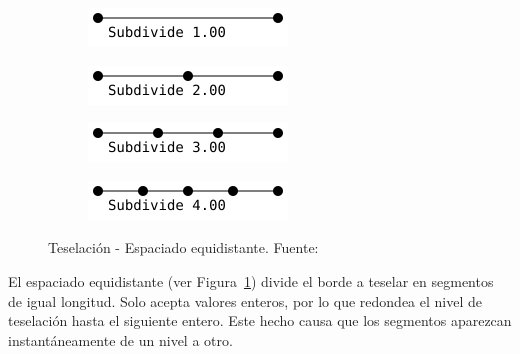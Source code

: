 \begin{figure}[ht]
	\centering
	\begin{subfigure}{.45\textwidth}
			\includegraphics[width=\textwidth]{figures/equal1.png}	
	\end{subfigure}	
	\hfill
	\begin{subfigure}{.45\textwidth}
			\includegraphics[width=\textwidth]{figures/equal2.png}	
	\end{subfigure}	
	\newline
	\begin{subfigure}{.45\textwidth}
			\includegraphics[width=\textwidth]{figures/equal3.png}	
	\end{subfigure}	
	\hfill
	\begin{subfigure}{.45\textwidth}
			\includegraphics[width=\textwidth]{figures/equal4.png}	
	\end{subfigure}	
	\caption[Teselación - Espaciado equidistante.]{Teselación - Espaciado
	equidistante. Fuente:~\cite{TessellationImages}}
	\label{fig3.2}
\end{figure}

El espaciado equidistante (ver Figura~\ref{fig3.2}) divide el borde a teselar
en segmentos de igual longitud. Solo acepta valores enteros, por lo que redondea
el nivel de teselación hasta el siguiente entero. Este hecho causa que los
segmentos aparezcan instantáneamente de un nivel a otro.

